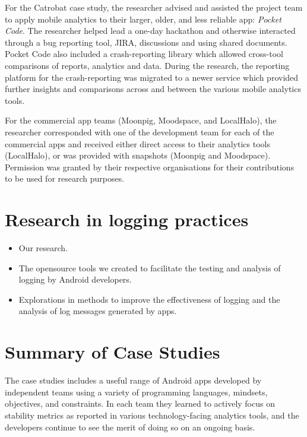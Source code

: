 For the Catrobat case study, the researcher advised and assisted the project team to apply mobile analytics to their larger, older, and less reliable app: \emph{Pocket Code}. The researcher helped lead a one-day hackathon and otherwise interacted through a bug reporting tool, JIRA, discussions and using shared documents. Pocket Code also included a crash-reporting library which allowed cross-tool comparisons of reports, analytics and data. During the research, the reporting platform for the crash-reporting was migrated to a newer service which provided further insights and comparisons across and between the various mobile analytics tools.

For the commercial app teams (Moonpig, Moodspace, and LocalHalo), the researcher corresponded with one of the development team for each of the commercial apps and received either direct access to their analytics tools (LocalHalo), or was provided with snapshots (Moonpig and Moodspace). Permission was granted by their respective organisations for their contributions to be used for research purposes.
\newpage


\newpage


\newpage


\newpage



\section{Research in logging practices}

\begin{itemize}
    \item Our research.
    \item The opensource tools we created to facilitate the testing and analysis of logging by Android developers.
    \item Explorations in methods to improve the effectiveness of logging and the analysis of log messages generated by apps.
\end{itemize}




\section{Summary of Case Studies}
The case studies includes a useful range of Android apps developed by independent teams using a variety of programming languages, mindsets, objectives, and constraints. In each team they learned to actively focus on stability metrics as reported in various technology-facing analytics tools, and the developers continue to see the merit of doing so on an ongoing basis.